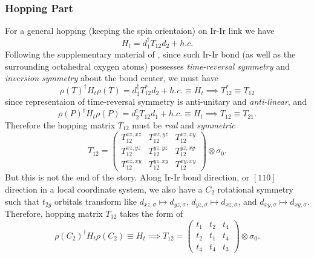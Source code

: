 \documentclass[10pt,nofootinbib]{revtex4}
\begin{document}
		\subsubsection{Hopping Part}
			For a general hopping (keeping the spin orientaion) on Ir-Ir link we have 
			\begin{equation}\label{2.2.1}
				H_t=d_1^\dagger T_{12} d_2+h.c.
			\end{equation}
			Following the supplementary material of \cite{rau2014generic}, since such Ir-Ir bond (as well as the surrounding octahedral oxygen atoms) possesses \emph{time-reversal symmetry} and \emph{inversion symmetry} about the bond center, we must have
			\begin{equation*}
				\rho(T)^\dagger H_t\rho(T)=d_1^\dagger T_{12}^* d_2+h.c.\equiv H_t\implies T_{12}^*\equiv T_{12}
			\end{equation*}
			 since representaion of time-reversal symmetry is anti-unitary and \emph{anti-linear}, and
			\begin{equation*}
				\rho(P)^\dagger H_t\rho(P)=d_2^\dagger T_{12} d_1+h.c.\equiv H_t\implies T_{12}\equiv T_{21}.
			\end{equation*}
			Therefore the hopping matrix $T_{12}$ must be \emph{real} and \emph{symmetric}
			\begin{equation*}
				T_{12}=\left(\begin{array}{ccc}
					T_{12}^{xz,xz} & T_{12}^{xz,yz} & T_{12}^{xz,xy} \\
					T_{12}^{xz,yz} & T_{12}^{yz,yz} & T_{12}^{yz,xy} \\
					T_{12}^{xz,xy} & T_{12}^{yz,xy} & T_{12}^{xy,xy} 
				\end{array}\right)\otimes \sigma_0.
			\end{equation*}
			\indent But this is not the end of the story. Along Ir-Ir bond direction, or $[110]$ direction in a local coordinate system, we also have a $C_2$ rotational symmetry such that $t_{2g}$ orbitals transform like $d_{xz,\sigma}\mapsto d_{yz,\sigma}$, $d_{yz,\sigma}\mapsto d_{xz,\sigma}$, and $d_{xy,\sigma}\mapsto d_{xy,\sigma}$. Therefore, hopping matrix $T_{12}$ takes the form of
			\begin{equation}\label{2.2.2}
				\rho(C_2)^\dagger H_t\rho(C_2)\equiv H_t\implies T_{12}=\left(\begin{array}{ccc}
					t_1 & t_2 & t_4 \\
					t_2 & t_1 & t_4 \\
					t_4 & t_4 & t_3
				\end{array}\right)\otimes\sigma_0.
			\end{equation}
\end{document}
